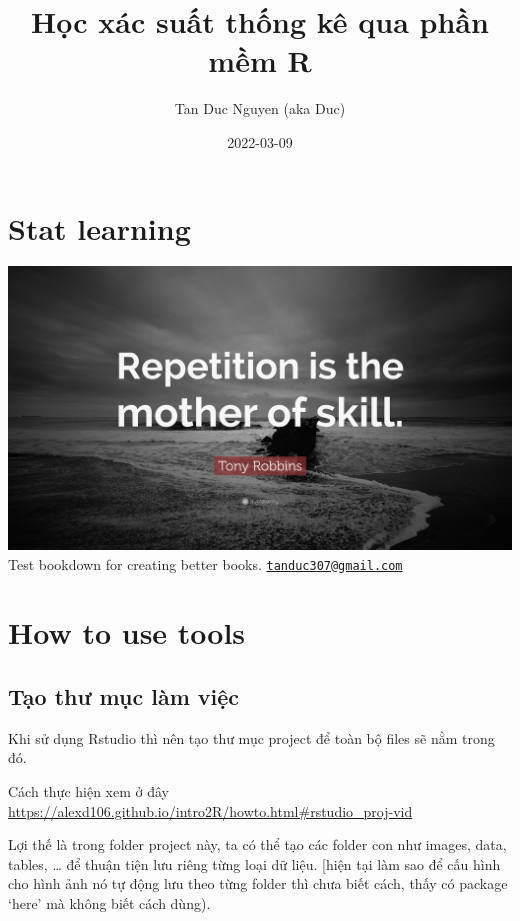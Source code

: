 \documentclass[
]{book}
\title{Học xác suất thống kê qua phần mềm R}
\author{Tan Duc Nguyen (aka Duc)}
\date{2022-03-09}
\begin{document}
\maketitle

{
\setcounter{tocdepth}{1}
\tableofcontents
}
\hypertarget{stat-learning}{%
\chapter{Stat learning}\label{stat-learning}}

\includegraphics[width=1\textwidth,height=\textheight]{images/Quotefancy-237580-3840x2160.jpg}
Test bookdown for creating better books.
\href{mailto:tanduc307@gmail.com}{\nolinkurl{tanduc307@gmail.com}}

\hypertarget{how-to-use-tools}{%
\chapter{How to use tools}\label{how-to-use-tools}}

\hypertarget{tux1ea1o-thux1b0-mux1ee5c-luxe0m-viux1ec7c}{%
\section{Tạo thư mục làm việc}\label{tux1ea1o-thux1b0-mux1ee5c-luxe0m-viux1ec7c}}

Khi sử dụng Rstudio thì nên tạo thư mục project để toàn bộ files sẽ nằm trong đó.

Cách thực hiện xem ở đây \url{https://alexd106.github.io/intro2R/howto.html\#rstudio_proj-vid}

Lợi thế là trong folder project này, ta có thể tạo các folder con như images, data, tables, \ldots{} để thuận tiện lưu riêng từng loại dữ liệu. {[}hiện tại làm sao để cấu hình cho hình ảnh nó tự động lưu theo từng folder thì chưa biết cách, thấy có package `here' mà không biết cách dùng).
\end{document}
